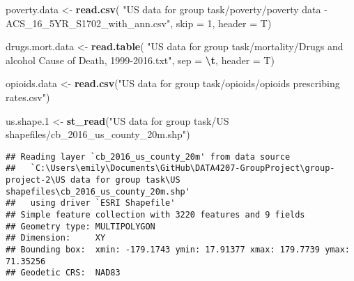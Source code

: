 \documentclass[
]{article}
\newenvironment{Shaded}{\begin{snugshade}}{\end{snugshade}}
\newcommand{\AttributeTok}[1]{\textcolor[rgb]{0.13,0.29,0.53}{#1}}
\newcommand{\DecValTok}[1]{\textcolor[rgb]{0.00,0.00,0.81}{#1}}
\newcommand{\FloatTok}[1]{\textcolor[rgb]{0.00,0.00,0.81}{#1}}
\newcommand{\FunctionTok}[1]{\textcolor[rgb]{0.13,0.29,0.53}{\textbf{#1}}}
\newcommand{\NormalTok}[1]{#1}
\newcommand{\OtherTok}[1]{\textcolor[rgb]{0.56,0.35,0.01}{#1}}
\newcommand{\SpecialCharTok}[1]{\textcolor[rgb]{0.81,0.36,0.00}{\textbf{#1}}}
\newcommand{\StringTok}[1]{\textcolor[rgb]{0.31,0.60,0.02}{#1}}
\begin{document}
\begin{Shaded}
\begin{Highlighting}[]
\NormalTok{poverty.data }\OtherTok{\textless{}{-}} \FunctionTok{read.csv}\NormalTok{(}
  \StringTok{"US data for group task/poverty/poverty data {-} ACS\_16\_5YR\_S1702\_with\_ann.csv"}\NormalTok{, }
  \AttributeTok{skip =} \DecValTok{1}\NormalTok{, }\AttributeTok{header =}\NormalTok{ T)}
\end{Highlighting}
\end{Shaded}

\begin{Shaded}
\begin{Highlighting}[]
\NormalTok{drugs.mort.data }\OtherTok{\textless{}{-}} \FunctionTok{read.table}\NormalTok{(}
  \StringTok{"US data for group task/mortality/Drugs and alcohol Cause of Death, 1999{-}2016.txt"}\NormalTok{, }
    \AttributeTok{sep =} \StringTok{\textquotesingle{}}\SpecialCharTok{\textbackslash{}t}\StringTok{\textquotesingle{}}\NormalTok{, }\AttributeTok{header =}\NormalTok{ T)}
\end{Highlighting}
\end{Shaded}

\begin{Shaded}
\begin{Highlighting}[]
\NormalTok{opioids.data }\OtherTok{\textless{}{-}} \FunctionTok{read.csv}\NormalTok{(}\StringTok{"US data for group task/opioids/opioids prescribing rates.csv"}\NormalTok{)}
\end{Highlighting}
\end{Shaded}

\begin{Shaded}
\begin{Highlighting}[]
\NormalTok{us.shape}\FloatTok{.1} \OtherTok{\textless{}{-}} 
  \FunctionTok{st\_read}\NormalTok{(}\StringTok{"US data for group task/US shapefiles/cb\_2016\_us\_county\_20m.shp"}\NormalTok{)}
\end{Highlighting}
\end{Shaded}

\begin{verbatim}
## Reading layer `cb_2016_us_county_20m' from data source 
##   `C:\Users\emily\Documents\GitHub\DATA4207-GroupProject\group-project-2\US data for group task\US shapefiles\cb_2016_us_county_20m.shp' 
##   using driver `ESRI Shapefile'
## Simple feature collection with 3220 features and 9 fields
## Geometry type: MULTIPOLYGON
## Dimension:     XY
## Bounding box:  xmin: -179.1743 ymin: 17.91377 xmax: 179.7739 ymax: 71.35256
## Geodetic CRS:  NAD83
\end{verbatim}
\end{document}

